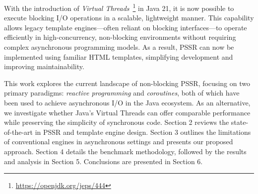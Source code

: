 With the introduction of \textit{Virtual Threads}~\footnote{\url{https://openjdk.org/jeps/444}}
in Java 21, it is now possible to execute blocking I/O operations in a
scalable, lightweight manner. This capability allows legacy template
engines—often reliant on blocking interfaces—to operate efficiently in
high-concurrency, non-blocking environments without requiring complex
asynchronous programming models. As a result, PSSR
can now be implemented using familiar HTML templates, 
simplifying development and improving maintainability.

This work explores the current landscape of non-blocking PSSR, focusing on two
primary paradigms: \textit{reactive programming} and \textit{coroutines}, both
of which have been used to achieve asynchronous I/O in the Java ecosystem. As an
alternative, we investigate whether Java’s Virtual Threads can offer comparable
performance while preserving the simplicity of synchronous code. Section 2
reviews the state-of-the-art in PSSR and template engine design. Section 3
outlines the limitations of conventional engines in asynchronous settings and
presents our proposed approach. Section 4 details the benchmark methodology,
followed by the results and analysis in Section 5. Conclusions are presented in Section 6.